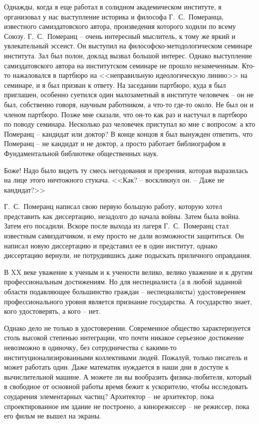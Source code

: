 \documentclass{book}
\begin{document}
Однажды, когда я еще работал в солидном академическом институте, я организовал у нас выступление историка и философа Г.~С.~Померанца, известного самиздатовского автора, произведения которого ходили по всему Союзу. Г.~С.~Померанц -- очень интересный мыслитель, к тому же яркий и увлекательный эссеист. Он выступил на философско-методологическом семинаре института. Зал был полон, доклад вызвал большой интерес. Однако выступление самиздатовского автора на институтском семинаре не прошло незамеченным. Кто-то нажаловался в партбюро на <<неправильную идеологическую линию>> на семинаре, и я был призван к ответу. На заседании партбюро, куда я был приглашен, особенно суетился один малозаметный в институте человечек -- он не был, собственно говоря, научным работником, а что-то где-то около. Не был он и членом партбюро. Позже мне сказали, что он-то как раз и настучал в партбюро по поводу семинара. Несколько раз человечек приступал ко мне с вопросом: а кто Померанц -- кандидат или доктор? В конце концов я был вынужден ответить,  что Померанц -- не кандидат и не доктор, а просто работает библиографом в Фундаментальной библиотеке общественных наук.

Боже! Надо было видеть ту смесь негодования и презрения, которая выразилась на лице этого ничтожного стукача. <<Как? -- воскликнул он. -- Даже не кандидат?>>

Г.~С.~Померанц написал свою первую большую работу, которую хотел представить как диссертацию, незадолго до начала войны. Затем была война. Затем его посадили. Вскоре после выхода из лагеря Г.~С.~Померанц стал известным самиздатчиком, и ему просто не дали возможности защититься. Он написал новую диссертацию и представил ее в один институт, однако диссертацию вернули, не потрудившись даже подыскать приличного оправдания.

В XX веке уважение к ученым и к учености велико, велико уважение и к другим профессиональным достижениям. Но для неспециалиста (а в любой заданной области подавляющее большинство граждан -- неспециалисты) удостоверением профессионального уровня является признание государства. А государство знает, кого удостоверять, а кого -- нет.

Однако дело не только в удостоверении. Современное общество характеризуется столь высокой степенью интеграции, что почти никакое серьезное достижение невозможно в одиночку, без сотрудничества с какими-то институционализированными коллективами людей. Пожалуй, только писатель и может работать один. Даже математик нуждается в наши дни в доступе к вычислительной машине. А можете ли вы вообразить физика-любителя, который в свободное от основной работы время бежит к ускорителю, чтобы исследовать соударения элементарных частиц? Архитектор -- не архитектор, пока спроектированное им здание не построено, а кинорежиссер -- не режиссер, пока его фильм не вышел на экраны.
\end{document}
